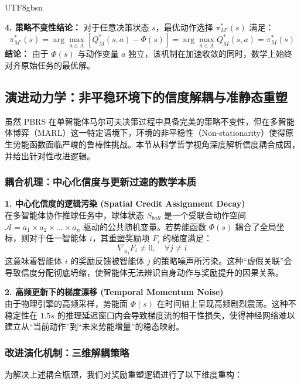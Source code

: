 \documentclass[11pt,a4paper]{article}
\begin{document}
\begin{CJK*}{UTF8}{gbsn}
\begin{tcolorbox}[enhanced, colback=blue!5!white, colframe=SDUBlue, arc=2mm, title=\textbf{PBRS 理论推导、级数消去与策略不变性证明}]
\textbf{4. 策略不变性结论：}
对于任意决策状态 $s$，最优动作选择 $\pi_{M'}^*(s)$ 满足：
\begin{equation}
\pi_{M'}^*(s) = \arg\max_{a \in A} [Q_M^*(s, a) - \Phi(s)] = \arg\max_{a \in A} Q_M^*(s, a) = \pi_M^*(s)
\end{equation}
\textbf{结论：} 
由于 $\Phi(s)$ 与动作变量 $a$ 独立，该机制在加速收敛的同时，数学上始终对齐原始任务的最优解。
\end{tcolorbox}

\subsection{演进动力学：非平稳环境下的信度解耦与准静态重塑}

虽然 PBRS 在单智能体马尔可夫决策过程中具备完美的策略不变性，但在多智能体博弈（MARL）这一特定语境下，环境的非平稳性（Non-stationarity）使得原生势能函数面临严峻的鲁棒性挑战。本节从科学哲学视角深度解析信度耦合成因，并给出针对性改进逻辑。

\subsubsection{耦合机理：中心化信度与更新过速的数学本质}

\textbf{1. 中心化信度的逻辑污染 (Spatial Credit Assignment Decay)} \\
在多智能体协作推球任务中，球体状态 $S_{ball}$ 是一个受联合动作空间 $\mathcal{A} = a_1 \times a_2 \times \dots \times a_n$ 驱动的公共随机变量。若势能函数 $\Phi(s)$ 耦合了全局坐标，则对于任一智能体 $i$，其重塑奖励项 $F_i$ 的梯度满足：
\begin{equation}
\nabla_{a_j} F_i \neq 0, \quad \forall j \neq i
\end{equation}
这意味着智能体 $i$ 的奖励反馈被智能体 $j$ 的策略噪声所污染。这种“虚假关联”会导致信度分配彻底坍缩，使智能体无法辨识自身动作与奖励提升的因果关系。

\textbf{2. 高频更新下的梯度漂移 (Temporal Momentum Noise)} \\
由于物理引擎的高频采样，势能面 $\Phi(s)$ 在时间轴上呈现高频剧烈震荡。这种不稳定性在 $1.5s$ 的推理延迟窗口内会导致梯度流的相干性损失，使得神经网络难以建立从“当前动作”到“未来势能增量”的稳态映射。

\subsubsection{改进演化机制：三维解耦策略}

为解决上述耦合瓶颈，我们对奖励重塑逻辑进行了以下维度重构：


\end{CJK*}
\end{document}
